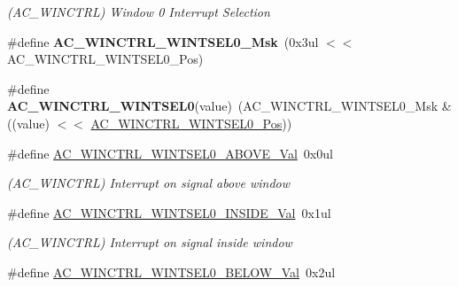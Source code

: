 \begin{DoxyCompactItemize}
\begin{DoxyCompactList}\small\item\em (A\+C\+\_\+\+W\+I\+N\+C\+T\+R\+L) Window 0 Interrupt Selection \end{DoxyCompactList}\item 
\hypertarget{group___s_a_m_l21___a_c_ga71dbb9c9f7b7381eebe22593044610c8}{}\#define {\bfseries A\+C\+\_\+\+W\+I\+N\+C\+T\+R\+L\+\_\+\+W\+I\+N\+T\+S\+E\+L0\+\_\+\+Msk}~(0x3ul $<$$<$ A\+C\+\_\+\+W\+I\+N\+C\+T\+R\+L\+\_\+\+W\+I\+N\+T\+S\+E\+L0\+\_\+\+Pos)\label{group___s_a_m_l21___a_c_ga71dbb9c9f7b7381eebe22593044610c8}

\item 
\hypertarget{group___s_a_m_l21___a_c_gaf46f3e5bd573d5b57dec6bd90df52da8}{}\#define {\bfseries A\+C\+\_\+\+W\+I\+N\+C\+T\+R\+L\+\_\+\+W\+I\+N\+T\+S\+E\+L0}(value)~(A\+C\+\_\+\+W\+I\+N\+C\+T\+R\+L\+\_\+\+W\+I\+N\+T\+S\+E\+L0\+\_\+\+Msk \& ((value) $<$$<$ \hyperlink{group___s_a_m_l21___a_c_gaf7bc05aa7122fff6ea05ae690cbc8486}{A\+C\+\_\+\+W\+I\+N\+C\+T\+R\+L\+\_\+\+W\+I\+N\+T\+S\+E\+L0\+\_\+\+Pos}))\label{group___s_a_m_l21___a_c_gaf46f3e5bd573d5b57dec6bd90df52da8}

\item 
\hypertarget{group___s_a_m_l21___a_c_ga4e693526712b2cfcabdab157f1f8be71}{}\#define \hyperlink{group___s_a_m_l21___a_c_ga4e693526712b2cfcabdab157f1f8be71}{A\+C\+\_\+\+W\+I\+N\+C\+T\+R\+L\+\_\+\+W\+I\+N\+T\+S\+E\+L0\+\_\+\+A\+B\+O\+V\+E\+\_\+\+Val}~0x0ul\label{group___s_a_m_l21___a_c_ga4e693526712b2cfcabdab157f1f8be71}

\begin{DoxyCompactList}\small\item\em (A\+C\+\_\+\+W\+I\+N\+C\+T\+R\+L) Interrupt on signal above window \end{DoxyCompactList}\item 
\hypertarget{group___s_a_m_l21___a_c_ga68bafe85eeb71ce0ce83d48a51cb95f6}{}\#define \hyperlink{group___s_a_m_l21___a_c_ga68bafe85eeb71ce0ce83d48a51cb95f6}{A\+C\+\_\+\+W\+I\+N\+C\+T\+R\+L\+\_\+\+W\+I\+N\+T\+S\+E\+L0\+\_\+\+I\+N\+S\+I\+D\+E\+\_\+\+Val}~0x1ul\label{group___s_a_m_l21___a_c_ga68bafe85eeb71ce0ce83d48a51cb95f6}

\begin{DoxyCompactList}\small\item\em (A\+C\+\_\+\+W\+I\+N\+C\+T\+R\+L) Interrupt on signal inside window \end{DoxyCompactList}\item 
\hypertarget{group___s_a_m_l21___a_c_gab989630a135aae7f20d8d1161fae744a}{}\#define \hyperlink{group___s_a_m_l21___a_c_gab989630a135aae7f20d8d1161fae744a}{A\+C\+\_\+\+W\+I\+N\+C\+T\+R\+L\+\_\+\+W\+I\+N\+T\+S\+E\+L0\+\_\+\+B\+E\+L\+O\+W\+\_\+\+Val}~0x2ul\label{group___s_a_m_l21___a_c_gab989630a135aae7f20d8d1161fae744a}


\end{DoxyCompactItemize}
